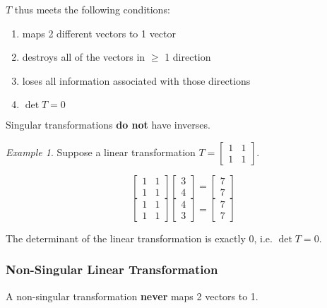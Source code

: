 \documentclass[a4paper]{article}
\theoremstyle{remark}
\newtheorem{example}{Example}
\theoremstyle{theorem}
\begin{document}
$T$ thus meets the following conditions:
\begin{enumerate}
	\item maps 2 different vectors to 1 vector
	\item destroys all of the vectors in $\geq$ 1 direction
	\item loses all information associated with those directions
	\item $\det{T} = 0$
\end{enumerate}

Singular transformations \textbf{do not} have inverses.

\begin{example}
	Suppose a linear transformation $T = \begin{bmatrix} 1 & 1 \\ 1 & 1\end{bmatrix}$.

	\begin{equation}
		\begin{bmatrix} 1 & 1 \\ 1 & 1 \end{bmatrix}
		\begin{bmatrix} 3 \\ 4\end{bmatrix}
		=
		\begin{bmatrix} 7 \\ 7\end{bmatrix}
	\end{equation}
	\begin{equation}
		\begin{bmatrix} 1 & 1 \\ 1 & 1 \end{bmatrix}
		\begin{bmatrix} 4 \\ 3\end{bmatrix}
		=
		\begin{bmatrix} 7 \\ 7\end{bmatrix}
	\end{equation}

	The determinant of the linear transformation is exactly 0, i.e. $\det{T} = 0$.
\end{example}

\subsubsection{Non-Singular Linear Transformation}
A non-singular transformation \textbf{never} maps 2 vectors to 1.
\end{document}
